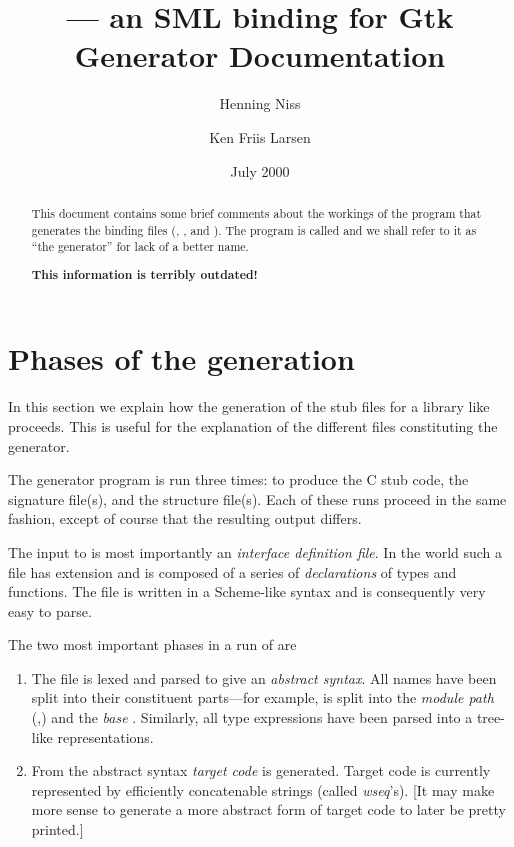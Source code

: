 \documentclass{article}
\title{{\large {\libname} --- an SML binding for Gtk}\\
       Generator Documentation}
\author{Henning Niss\and Ken Friis Larsen}
\date{July 2000}
\begin{document}
\maketitle

\begin{abstract}
This document contains some brief comments about the workings of the
program that generates the {\libname} binding files
(, , and ). The
program is called {\progname} and we shall refer to it as ``the
generator'' for lack of a better name.

\begin{center}
\textbf{This information is terribly outdated!}
\end{center}
\end{abstract}

\tableofcontents

\section{Phases of the generation}

In this section we explain how the generation of the stub files for a
library like {\libname} proceeds. This is useful for the explanation
of the different files constituting the generator.

The generator program is run three times: to produce the C stub code,
the signature file(s), and the structure file(s). Each of these runs
proceed in the same fashion, except of course that the resulting
output differs.

The input to {\progname} is most importantly an
\emph{interface definition file}. In the {\gtkname} world such a file
has extension  and is composed of a series of
\emph{declarations} of types and functions.  The file is written in a
Scheme-like syntax and is consequently very easy to parse.

The two most important phases in a run of {\progname} are
\begin{enumerate}
\item The  file is lexed and parsed to give an
  \emph{abstract syntax}. All names have been split into their
  constituent parts---for example,  is split
  into the \emph{module path} (,) and the
  \emph{base} . Similarly, all type expressions have been
  parsed into a tree-like representations.
  
\item From the abstract syntax \emph{target code} is generated. Target
  code is currently represented by efficiently concatenable strings
  (called \emph{wseq}'s).  [It may make more sense to generate a more
  abstract form of target code to later be pretty printed.]
\end{enumerate}
\end{document}
